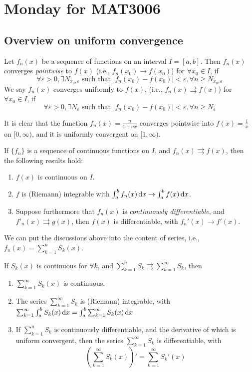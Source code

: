 \section{Monday for MAT3006}
\subsection{Overview on uniform convergence}
\begin{definition}[Convergence]
Let $f_n(x)$ be a sequence of functions on an interval $I=[a,b]$. Then $f_n(x)$ converges \emph{pointwise} to $f(x)$ (i.e., $f_n(x_0)\to f(x_0)$) for $\forall x_0\in I$, if
\[
\forall\varepsilon>0,\exists N_{x_0,\varepsilon}\mbox{ such that }|f_n(x_0)-f(x_0)|<\varepsilon,\forall n\ge N_{x_0,\varepsilon}
\]
We say $f_n(x)$ converges uniformly to $f(x)$, (i.e., $f_n(x)\rightrightarrows f(x)$) for $\forall x_0\in I$, if
\[
\forall\varepsilon>0,\exists N_{\varepsilon}\mbox{ such that }|f_n(x_0)-f(x_0)|<\varepsilon,\forall n\ge N_{\varepsilon}
\]
\end{definition}
\begin{example}
It is clear that 
the function $f_n(x)=\frac{n}{1+nx}$ converges pointwise into $f(x)=\frac{1}{x}$ on $[0,\infty)$, and it is uniformly convergent on $[1,\infty)$.
\end{example}
\begin{proposition}
If $\{f_n\}$ is a sequence of continuous functions on $I$, and $f_n(x)\rightrightarrows f(x)$, then the following results hold:
\begin{enumerate}
\item
$f(x)$ is continuous on $I$.
\item
$f$ is (Riemann) integrable with $\int_a^bf_n(x)\,\mathrm{d} x\to\int_a^bf(x)\,\mathrm{d} x$.
\item
Suppose furthermore that $f_n(x)$ is \emph{continuously differentiable}, and $f'_n(x)\rightrightarrows g(x)$, then $f(x)$ is differentiable, with $f_n'(x)\to f'(x)$.
\end{enumerate}
\end{proposition}
We can put the discussions above into the content of series, i.e., $f_n(x)=\sum_{k=1}^nS_k(x)$.
\begin{proposition}
If $S_k(x)$ is continuous for $\forall k$, and $\sum_{k=1}^nS_k\rightrightarrows \sum_{k=1}^\infty S_k$, then
\begin{enumerate}
\item
$\sum_{k=1}^\infty S_k(x)$ is continuous,
\item
The series $\sum_{k=1}^\infty S_k$ is (Riemann) integrable, with
$\sum_{k=1}^\infty\int_a^bS_k(x)\,\mathrm{d} x=\int_a^b\sum_{k=1}^\infty S_k(x)\,\mathrm{d} x$
\item
If $\sum_{k=1}^nS_k$ is continuously differentiable, and the derivative of which is uniform convergent, then the series $\sum_{k=1}^\infty S_k$ is differentiable, with
\[
\left(\sum_{k=1}^\infty S_k(x)\right)'=\sum_{k=1}^\infty S_k'(x)
\]
\end{enumerate}
\end{proposition}

